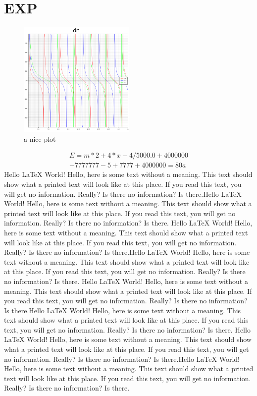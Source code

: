 \documentclass[12pt]{article}
\begin{document}
\section{EXP}
\begin{figure}[h]
    \centering
    \includegraphics[width=0.5\textwidth, height=0.25\textheight]{dn.png}
    \caption{a nice plot}
    \label{fig:dn_plot}
\end{figure}
\begin{equation}
    \begin{aligned}
    E = m*2+4*x-4 / 5000.0 + 4000000 \\
    - 7777777 - 5 + 7777 + 4000000= 80a
\end{aligned}
\end{equation}
Hello LaTeX World!
Hello, here is some text without a meaning. This text should show what a printed text will look like at this place.
If you read this text, you will get no information. Really? Is there no information? Is there.Hello LaTeX World!
Hello, here is some text without a meaning. This text should show what a printed text will look like at this place.
If you read this text, you will get no information. Really? Is there no information? Is there.
Hello LaTeX World!
Hello, here is some text without a meaning. This text should show what a printed text will look like at this place.
If you read this text, you will get no information. Really? Is there no information? Is there.Hello LaTeX World!
Hello, here is some text without a meaning. This text should show what a printed text will look like at this place.
If you read this text, you will get no information. Really? Is there no information? Is there.
Hello LaTeX World!
Hello, here is some text without a meaning. This text should show what a printed text will look like at this place.
If you read this text, you will get no information. Really? Is there no information? Is there.Hello LaTeX World!
Hello, here is some text without a meaning. This text should show what a printed text will look like at this place.
If you read this text, you will get no information. Really? Is there no information? Is there.
Hello LaTeX World!
Hello, here is some text without a meaning. This text should show what a printed text will look like at this place.
If you read this text, you will get no information. Really? Is there no information? Is there.Hello LaTeX World!
Hello, here is some text without a meaning. This text should show what a printed text will look like at this place.
If you read this text, you will get no information. Really? Is there no information? Is there.
\end{document}
